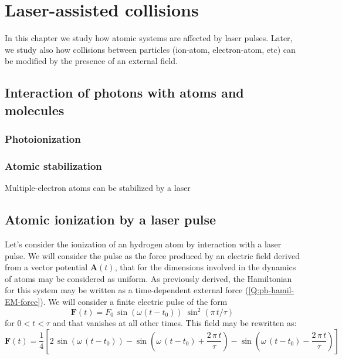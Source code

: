 \chapter{Laser-assisted collisions}

In this chapter we study how atomic systems are affected by laser pulses. Later, we study also how collisions between particles (ion-atom, electron-atom, etc) can be modified by the presence of an external field.

\section{Interaction of photons with atoms and molecules}

\subsection{Photoionization}
\label{S:photoionization}


\subsection{Atomic stabilization}
\label{S:atomic-stabilization}

Multiple-electron atoms can be stabilized by a laser \cite{Gavrila2002JPBpR147}


\section{Atomic ionization by a laser pulse}
\label{S:atomic-ionization}
Let's consider the ionization of an hydrogen atom by interaction with a laser pulse. We will consider the pulse as the force produced by an electric field derived from a vector potential $\bm{A}(t)$, that for the dimensions involved in the dynamics of atoms may be considered as uniform. As previously derived, the Hamiltonian for this system may be written as a time-dependent external force (\ref{Q:ph-hamil-EM-force}). We will consider a finite electric pulse of the form
\begin{equation} \label{Q:electric-field-Ft-0}
\bm{F}(t)= F_{0}\, \sin{(\omega (t-t_{0}))}\; \sin^{2}{(\pi\,t/\tau)} 
\end{equation}
for $0 < t < \tau $ and that vanishes at all other times. This field may be rewritten as:
\begin{equation} \label{Q:electric-field-Ft}
\bm{F}(t)= \frac{1}{4}\left[2\, \sin \left(\omega\, (t-t_{0})\right) - {\sin \left(\omega \, (t-t_{0}) +{\frac{2\,\pi\,t}{\tau}}\right) - \sin \left(\omega\, (t-t_{0}) - \frac{2\,\pi\,t}{\tau} \right)} 
 \right]
\end{equation}


